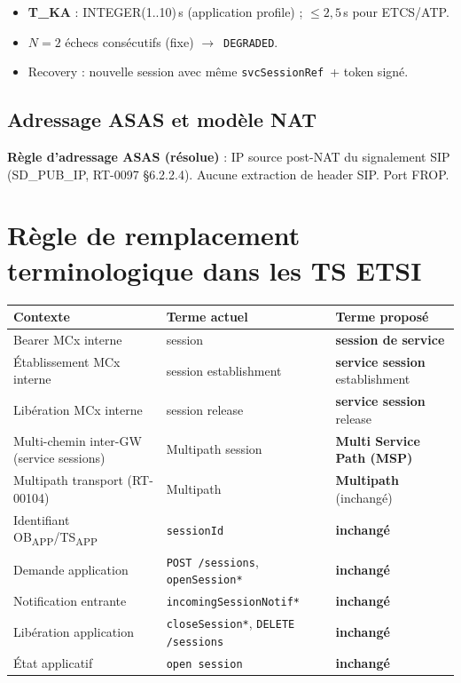 \documentclass[11pt,a4paper]{article}
\newcommand{\OBAPP}{OB\textsubscript{APP}}
\newcommand{\TSAPP}{TS\textsubscript{APP}}
\newcommand{\arr}{$\to$}
\newcommand{\svcref}{\texttt{svcSessionRef}}
\begin{document}
\begin{itemize}[leftmargin=2em]
  \item \textbf{T\_KA} : INTEGER(1..10)\,s (application profile) ;
    $\leq 2,5$\,s pour ETCS/ATP.
  \item \textbf{$N = 2$} échecs consécutifs (fixe) \arr\ \texttt{DEGRADED}.
  \item Recovery : nouvelle session avec même \svcref\ + token signé.
\end{itemize}

\subsection{Adressage ASAS et modèle NAT}
\label{sec:nat}

\textbf{Règle d'adressage ASAS (résolue)} : IP source post-NAT du signalement SIP
(SD\_PUB\_IP, RT-0097 §6.2.2.4). Aucune extraction de header SIP. Port FROP.

\section{Règle de remplacement terminologique dans les TS ETSI}

\begin{longtable}{p{5.5cm} p{4cm} p{4.5cm}}
  \toprule Contexte & Terme actuel & Terme proposé \\ \midrule \endhead
  Bearer MCx interne & session & \textbf{session de service} \\
  Établissement MCx interne & session establishment & \textbf{service session} establishment \\
  Libération MCx interne & session release & \textbf{service session} release \\
  Multi-chemin inter-GW (service sessions) & Multipath session & \textbf{Multi Service Path (MSP)} \\
  Multipath transport (RT-00104) & Multipath & \textbf{Multipath} (inchangé) \\
  Identifiant \OBAPP/\TSAPP & \texttt{sessionId} & \textbf{inchangé} \\
  Demande application & \texttt{POST /sessions}, \texttt{openSession*} & \textbf{inchangé} \\
  Notification entrante & \texttt{incomingSessionNotif*} & \textbf{inchangé} \\
  Libération application & \texttt{closeSession*}, \texttt{DELETE /sessions} & \textbf{inchangé} \\
  État applicatif & \texttt{open session} & \textbf{inchangé} \\
  \bottomrule
\end{longtable}
\end{document}

